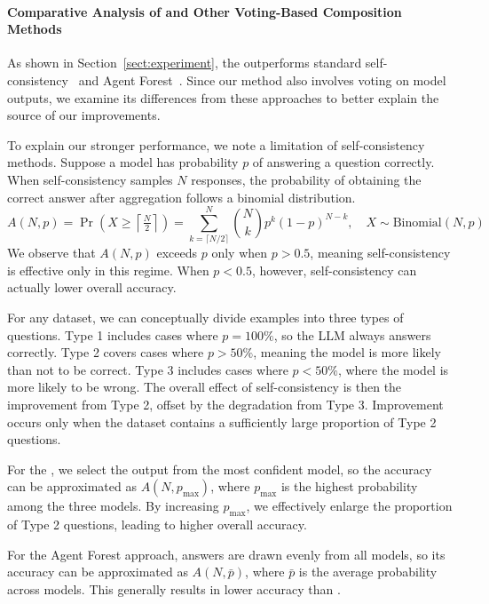 \label{sect:analysis}

\paragraph{Comparative Analysis of \NAME{} and Other Voting-Based Composition Methods} As shown in Section~\ref{sect:experiment}, the \NAME{}  outperforms standard self-consistency~\citep{wang2023selfconsistencyimproveschainthought} and Agent Forest~\citep{li2024agentsneed}. Since our method also involves voting on model outputs, we examine its differences from these approaches to better explain the source of our improvements.

To explain our stronger performance, we note a limitation of self-consistency methods. Suppose a model has probability $p$ of answering a question correctly. When self-consistency samples $N$ responses, the probability of obtaining the correct answer after aggregation follows a binomial distribution.
% 
\begin{equation}
A(N, p) = \Pr\left( X \geq \left\lceil \tfrac{N}{2} \right\rceil \right) = \sum_{k=\lceil N/2 \rceil}^{N} \binom{N}{k} p^{k}(1-p)^{N-k}, \quad X \sim \text{Binomial}(N,p)
\end{equation}
% 
We observe that $A(N,p)$ exceeds $p$ only when $p > 0.5$, meaning self-consistency is effective only in this regime. When $p < 0.5$, however, self-consistency can actually lower overall accuracy.

For any dataset, we can conceptually divide examples into three types of questions. Type 1 includes cases where $p = 100\%$, so the LLM always answers correctly. Type 2 covers cases where $p > 50\%$, meaning the model is more likely than not to be correct. Type 3 includes cases where $p < 50\%$, where the model is more likely to be wrong. The overall effect of self-consistency is then the improvement from Type 2, offset by the degradation from Type 3. Improvement occurs only when the dataset contains a sufficiently large proportion of Type 2 questions. 

For the \NAME{}, we select the output from the most confident model, so the accuracy can be approximated as $A(N, p_{\max})$, where $p_{\max}$ is the highest probability among the three models. By increasing $p_{\max}$, we effectively enlarge the proportion of Type 2 questions, leading to higher overall accuracy.


For the Agent Forest approach, answers are drawn evenly from all models, so its accuracy can be approximated as $A(N, \bar{p})$, where $\bar{p}$ is the average probability across models. This generally results in lower accuracy than \NAME{}.



